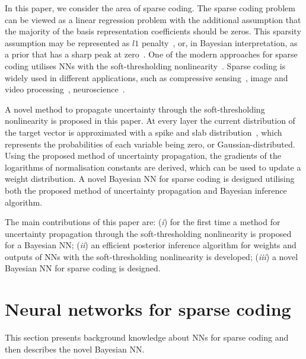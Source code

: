 \documentclass{article}
\begin{document}
  In this paper, we consider the area of sparse coding. The sparse coding problem can be viewed as a linear regression problem with the additional assumption that the majority of the basis representation coefficients should be zeros. This sparsity assumption may be represented as $l1$ penalty~\cite{tibshirani1996regression}, or, in Bayesian interpretation, as a prior that has a sharp peak at zero~\cite{tipping2001sparse}. One of the modern approaches for sparse coding utilises NNs with the soft-thresholding nonlinearity~\cite{gregor2010learning, sprechmann2015learning}. Sparse coding is widely used in different applications, such as compressive sensing~\cite{candes2008introduction}, image and video processing~\cite{mairal2014sparse, wang2015deep}, neuroscience~\cite{baillet1997bayesian, jas2017learning}.

  A novel method to propagate uncertainty through the soft-thresholding nonlinearity is proposed in this paper. At every layer the current distribution of the target vector is approximated with a spike and slab distribution~\cite{mitchell1988bayesian}, which represents the probabilities of each variable being zero, or Gaussian-distributed. Using the proposed method of uncertainty propagation, the gradients of the logarithms of normalisation constants are derived, which can be used to update a weight distribution. A novel Bayesian NN for sparse coding is designed utilising both the proposed method of uncertainty propagation and Bayesian inference algorithm.

  The main contributions of this paper are: (\textit{i}) for the first time a method for uncertainty propagation through the soft-thresholding nonlinearity is proposed for a Bayesian NN; (\textit{ii}) an efficient posterior inference algorithm for weights and outputs of NNs with the soft-thresholding nonlinearity is developed; (\textit{iii}) a novel Bayesian NN for sparse coding is designed.


\section{Neural networks for sparse coding}
  \label{sec:bayesian_lista}
 This section presents background knowledge about NNs for sparse coding and then describes the novel Bayesian NN.
\end{document}

